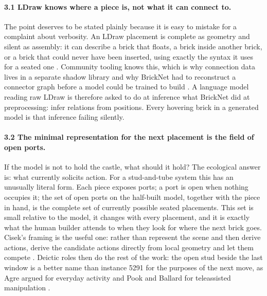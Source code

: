 \documentclass[11pt,a4paper]{article}
\begin{document}
\paragraph{3.1 LDraw knows where a piece is, not what it can connect to.} The point deserves to be stated plainly because it is easy to mistake for a complaint about verbosity. An LDraw placement is complete as geometry and silent as assembly: it can describe a brick that floats, a brick inside another brick, or a brick that could never have been inserted, using exactly the syntax it uses for a seated one \cite{ldrawformatspec}. Community tooling knows this, which is why connection data lives in a separate shadow library \cite{melkertldcadshadow} and why BrickNet had to reconstruct a connector graph before a model could be trained to build \cite{kulits2026bricknet}. A language model reading raw LDraw is therefore asked to do at inference what BrickNet did at preprocessing: infer relations from positions. Every hovering brick in a generated model is that inference failing silently.

\paragraph{3.2 The minimal representation for the next placement is the field of open ports.} If the model is not to hold the castle, what should it hold? The ecological answer is: what currently solicits action. For a stud-and-tube system this has an unusually literal form. Each piece exposes ports; a port is open when nothing occupies it; the set of open ports on the half-built model, together with the piece in hand, is the complete set of currently possible seated placements. This set is small relative to the model, it changes with every placement, and it is exactly what the human builder attends to when they look for where the next brick goes. Cisek's framing is the useful one: rather than represent the scene and then derive actions, derive the candidate actions directly from local geometry and let them compete \cite{cisek2007affordance}. Deictic roles then do the rest of the work: the open stud beside the last window is a better name than instance 5291 for the purposes of the next move, as Agre argued for everyday activity \cite{agre1988dynamic} and Pook and Ballard for teleassisted manipulation \cite{pook1996deictic}.
\end{document}
